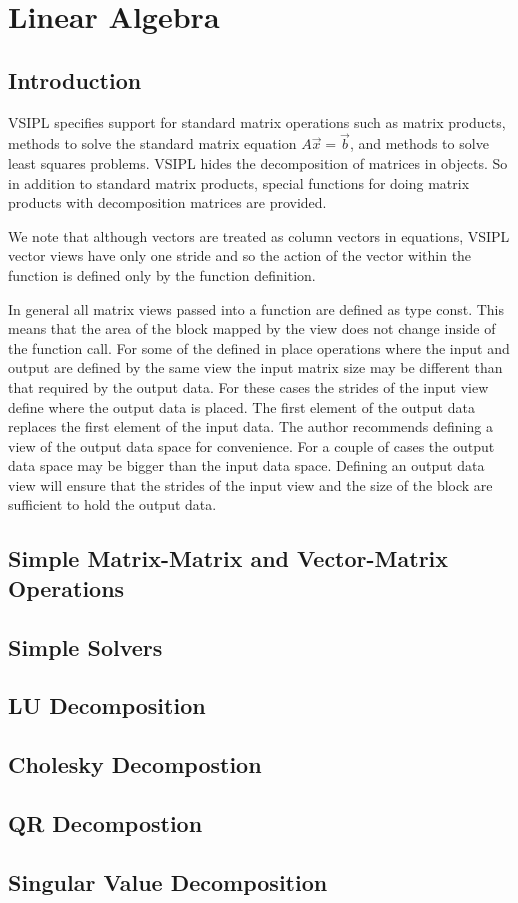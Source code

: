 \chapter{Linear Algebra}
\section*{Introduction}
VSIPL specifies support for standard matrix operations such as matrix products,
methods to solve the standard matrix equation $A \vec{x} = \vec{b}$, and methods to solve least squares problems. VSIPL hides the decomposition of matrices in objects. So in addition to standard matrix products, special functions for doing matrix products with decomposition matrices are provided.

We note that although vectors are treated as column vectors in equations, VSIPL vector views have only one stride and so the action of the vector within the function is defined only by the function definition.

In general all matrix views passed into a function are defined as type const. This means that the area of the block mapped by the view does not change inside of the function call. For some of the defined in place operations where the input and output are defined by the same view the input matrix size may be different than that required by the output data. For these cases the strides of the input view define where the output data is placed. The first element of the output data replaces the first element of the input data. The author recommends defining a view of the output data space for convenience. For a couple of cases the output data space may be bigger than the input data space. Defining an output data view will ensure that the strides of the input view and the size of the block are sufficient to hold the output data. 
\section*{Simple Matrix-Matrix and Vector-Matrix Operations}
\section*{Simple Solvers}
\section*{LU Decomposition}
\section*{Cholesky Decompostion}
\section*{QR Decompostion}
\section*{Singular Value Decomposition}

